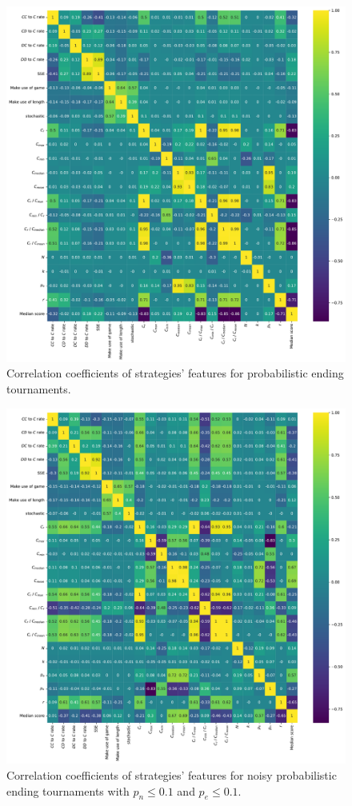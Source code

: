 \begin{figure}[!htbp]
    \begin{center}
        \includegraphics[width=.75\linewidth]{../images/probend_correlation_plot.pdf}
    \end{center}
    \caption{Correlation coefficients of strategies' features for probabilistic ending tournaments.}
\end{figure}
\begin{figure}[!htbp]
    \begin{center}
        \includegraphics[width=.75\linewidth]{../images/subset_probend_noise_correlation_plot.pdf}
    \end{center}
    \caption{Correlation coefficients of strategies' features for noisy probabilistic ending tournaments
    with $p_n \leq 0.1$ and $p_e \leq 0.1$.}
\end{figure}
